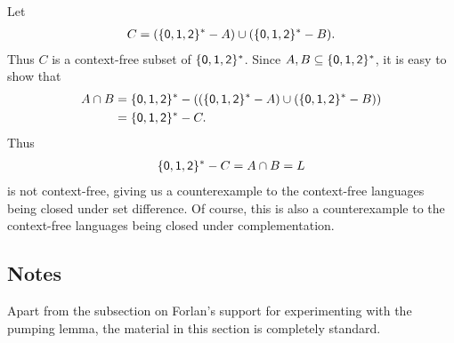 Let
\begin{gather*}
C=(\{\mathsf{0},\mathsf{1},\mathsf{2}\}^*-A) \cup (\{\mathsf{0},\mathsf{1},\mathsf{2}\}^*-B) .
\end{gather*}
Thus $C$ is a context-free subset of $\{\mathsf{0},\mathsf{1},\mathsf{2}\}^*$.
Since $A,B\subseteq\{\mathsf{0},\mathsf{1},\mathsf{2}\}^*$, it is easy to show that
\begin{align*}
A\cap B &= \{\mathsf{0},\mathsf{1},\mathsf{2}\}^*-
((\{\mathsf{0},\mathsf{1},\mathsf{2}\}^*-A)\cup(\{\mathsf{0},\mathsf{1},\mathsf{2}\}^*-B)) \\
&= \{\mathsf{0},\mathsf{1},\mathsf{2}\}^*-C .
\end{align*}
Thus
\begin{gather*}
\{\mathsf{0},\mathsf{1},\mathsf{2}\}^*-C = A\cap B = L
\end{gather*}
is not context-free, giving us a counterexample to the
context-free languages being closed under set difference.
Of course, this is also a counterexample to the context-free
languages being closed under complementation.

\subsection{Notes}

Apart from the subsection on Forlan's support for experimenting with
the pumping lemma, the material in this section is completely
standard.

%
%

